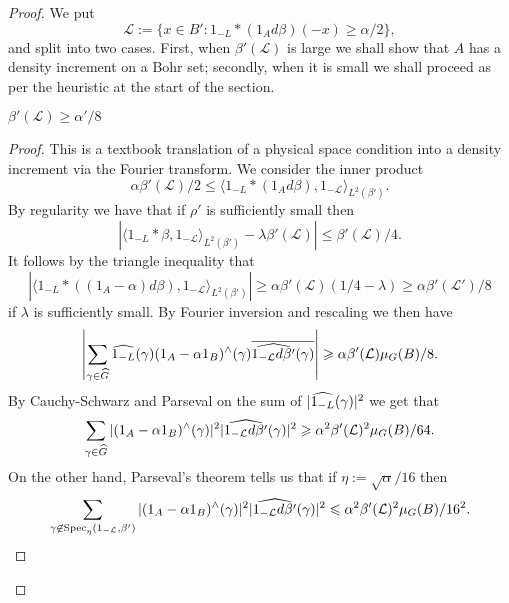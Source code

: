 \documentclass[12pt]{amsart}  %
\begin{document}
\begin{proof}
We put
\begin{equation*}
\mathcal{L}:=\{x \in B': 1_{-L} \ast (1_{A}d\beta)(-x) \geq \alpha/2\},
\end{equation*}
and split into two cases.  First, when $\beta'(\mathcal{L})$ is large we shall show that $A$ has a density increment on a Bohr set; secondly, when it is small we shall proceed as per the heuristic at the start of the section.
\begin{case*}$\beta'(\mathcal{L})\geq \alpha'/8$
\end{case*}
\begin{proof}  This is a textbook translation of a physical space condition into a density increment via the Fourier transform.  We consider the inner product
\begin{equation*}
\alpha\beta'(\mathcal{L})/2 \leq \langle 1_{-L} \ast (1_A d\beta),1_{-\mathcal{L}}\rangle_{L^2(\beta')}.
\end{equation*}
By regularity we have that if $\rho'$ is sufficiently small then 
\begin{equation*}
|\langle 1_{-L} \ast \beta,1_{-\mathcal{L}}\rangle_{L^2(\beta')} -\lambda \beta'(\mathcal{L})| \leq \beta'(\mathcal{L})/4.
\end{equation*}
It follows by the triangle inequality that
\begin{equation*}
| \langle 1_{-L} \ast( (1_A -\alpha)d\beta),1_{-\mathcal{L}}\rangle_{L^2(\beta')}| \geq \alpha\beta'(\mathcal{L})(1/4  -\lambda) \geq \alpha \beta'(\mathcal{L}')/8 
\end{equation*}
if $\lambda$ is sufficiently small.  By Fourier inversion and rescaling we then have
\begin{equation*}
\left|\sum_{\gamma \in \widehat{G}}{\widehat{1_{-L}}(\gamma)(1_A -\alpha1_B)^\wedge(\gamma)\overline{\widehat{1_{-\mathcal{L}}d\beta'}(\gamma)}}\right| \geqslant \alpha \beta'(\mathcal{L})\mu_G(B)/8.
\end{equation*}
By Cauchy-Schwarz and Parseval on the sum of $|\widehat{1_{-L}}(\gamma)|^2$ we get that
\begin{equation*}
\sum_{\gamma \in \widehat{G}}{|(1_A -\alpha1_B)^\wedge(\gamma)|^2|\widehat{1_{-\mathcal{L}}d\beta'}(\gamma)|^2} \geqslant \alpha^2\beta'(\mathcal{L})^2\mu_G(B)/64.
\end{equation*}
On the other hand, Parseval's theorem tells us that if $\eta:=\sqrt{\alpha}/16$ then
\begin{equation*}
\sum_{\gamma \not\in \Spec_\eta(1_{-\mathcal{L}},\beta')}{|(1_A -\alpha1_B)^\wedge(\gamma)|^2|\wh{1_{-\mathcal{L}}d\beta'}(\gamma)|^2} \leq \alpha^2 \beta'(\mathcal{L})^2\mu_G(B)/16^2.

\end{equation*}
\end{proof}
\end{proof}
\end{document}
